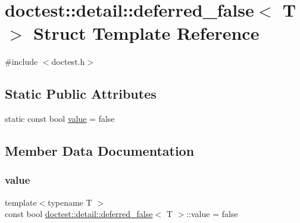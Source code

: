 \hypertarget{structdoctest_1_1detail_1_1deferred__false}{}\section{doctest\+:\+:detail\+:\+:deferred\+\_\+false$<$ T $>$ Struct Template Reference}
\label{structdoctest_1_1detail_1_1deferred__false}


{\ttfamily \#include $<$doctest.\+h$>$}

\subsection*{Static Public Attributes}
\begin{DoxyCompactItemize}
\item 
static const bool \hyperlink{structdoctest_1_1detail_1_1deferred__false_abc8eec7a8439ab592f76068cb408d106}{value} = false
\end{DoxyCompactItemize}


\subsection{Member Data Documentation}
\mbox{\label{structdoctest_1_1detail_1_1deferred__false_abc8eec7a8439ab592f76068cb408d106}} 
\subsubsection{\texorpdfstring{value}{value}}
{\footnotesize\ttfamily template$<$typename T $>$ \\
const bool \hyperlink{structdoctest_1_1detail_1_1deferred__false}{doctest\+::detail\+::deferred\+\_\+false}$<$ T $>$\+::value = false\hspace{0.3cm}{\ttfamily [static]}}

